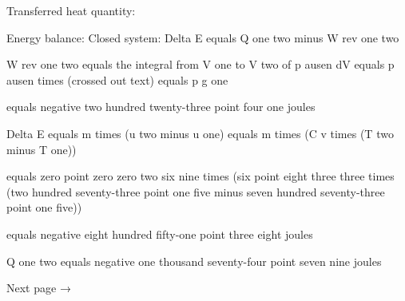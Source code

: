 Transferred heat quantity:

Energy balance: Closed system: Delta E equals Q one two minus W rev one two

W rev one two equals the integral from V one to V two of p ausen dV equals p ausen times (crossed out text) equals p g one

equals negative two hundred twenty-three point four one joules

Delta E equals m times (u two minus u one) equals m times (C v times (T two minus T one))

equals zero point zero zero two six nine times (six point eight three three times (two hundred seventy-three point one five minus seven hundred seventy-three point one five))

equals negative eight hundred fifty-one point three eight joules

Q one two equals negative one thousand seventy-four point seven nine joules

Next page →